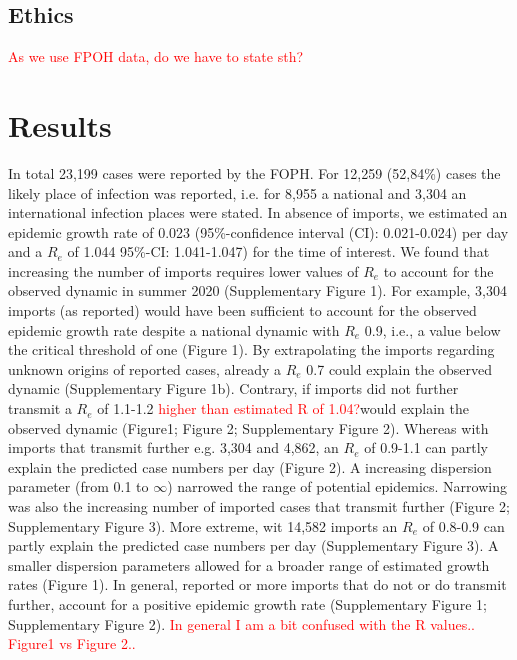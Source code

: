 \documentclass[10pt, a4paper, twoside]{article}
\begin{document}
\begin{multicols}{2}
\subsection{Ethics}
\textcolor{red}{As we use FPOH data, do we have to state sth?}

\section{Results}
In total 23,199 cases were reported by the FOPH. For 12,259 (52,84\%) cases the likely place of infection was reported, i.e. for 8,955 a national and 3,304 an international infection places were stated. 
In absence of imports, we estimated an epidemic growth rate of 0.023 (95\%-confidence interval (CI): 0.021-0.024) per day and a $R_e$ of 1.044 95\%-CI: 1.041-1.047) for the time of interest. 
We found that increasing the number of imports requires lower values of $R_e$ to account for the observed dynamic in summer 2020 (Supplementary Figure 1). 
For example, 3,304 imports (as reported) would have been sufficient to account for the observed epidemic growth rate despite a national dynamic with $R_e$ 0.9, i.e., a value below the critical threshold of one (Figure 1). 
By extrapolating the imports regarding unknown origins of reported cases, already a $R_e$ 0.7 could explain the observed dynamic (Supplementary Figure 1b). 
Contrary, if imports did not further transmit a $R_e$ of 1.1-1.2 \textcolor{red}{higher than estimated R of 1.04?}would explain the observed dynamic (Figure1; Figure 2; Supplementary Figure 2). 
Whereas with imports that transmit further e.g. 3,304 and 4,862, an $R_e$ of 0.9-1.1 can partly explain the predicted case numbers per day (Figure 2). 
A increasing dispersion parameter (from 0.1 to $\infty$) narrowed the range of potential epidemics. Narrowing was also the increasing number of imported cases that transmit further (Figure 2; Supplementary Figure 3).
More extreme, wit 14,582 imports an $R_e$ of 0.8-0.9 can partly explain the predicted case numbers per day (Supplementary Figure 3). 
A smaller dispersion parameters allowed for a broader range of estimated growth rates (Figure 1). 
In general, reported or more imports that do not or do transmit further, account for a positive epidemic growth rate (Supplementary Figure 1; Supplementary Figure 2).
\textcolor{red}{In general I am a bit confused with the R values.. Figure1 vs Figure 2..}

\end{multicols}
\end{document}
